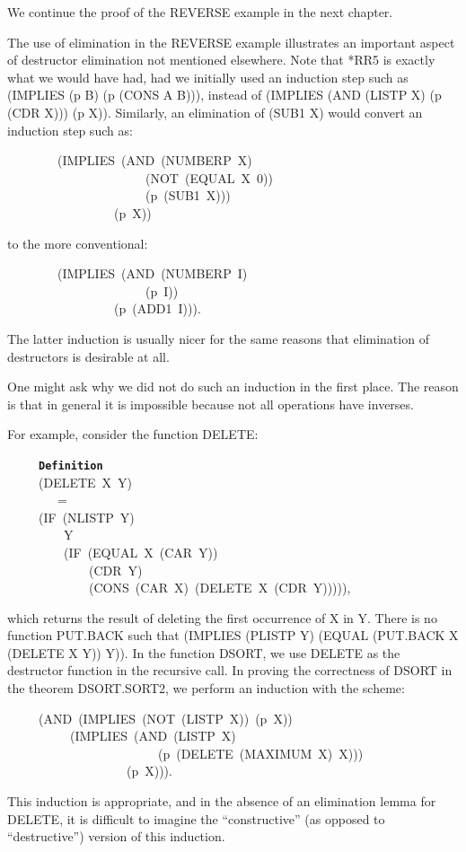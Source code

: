 \documentclass[11pt]{book}
\newenvironment{pubasis}{\begin{flushleft}\ttfamily\small}{\normalsize\rmfamily\end{flushleft}}
\newcommand{\axiomordefinition}[1]{\vspace{6pt}\texttt{\textbf{#1}}}
\begin{document}
We continue the proof of the REVERSE example in the
next chapter.

The use of elimination in the REVERSE example illustrates an important aspect of destructor elimination
not mentioned elsewhere.  Note that *RR5 is exactly what we would have
had, had we initially used an induction step such as (IMPLIES (p B) (p (CONS A B))),
instead of (IMPLIES (AND (LISTP X) (p (CDR X))) (p X)).  Similarly, an elimination
of (SUB1 X) would convert an induction step such as:
\begin{pubasis}
~~~~~~~~(IMPLIES~(AND~(NUMBERP~X)\\
~~~~~~~~~~~~~~~~~~~~~~(NOT~(EQUAL~X~0))\\
~~~~~~~~~~~~~~~~~~~~~~(p~(SUB1~X)))\\
~~~~~~~~~~~~~~~~~(p~X))\\
\end{pubasis}
to the more conventional:
\begin{pubasis}
~~~~~~~~(IMPLIES~(AND~(NUMBERP~I)\\
~~~~~~~~~~~~~~~~~~~~~~(p~I))\\
~~~~~~~~~~~~~~~~~(p~(ADD1~I))).\\
\end{pubasis}
The latter induction is usually nicer for the same reasons that
elimination of destructors is desirable at all.

One might ask why we did not do such an induction in the first place.
The reason is that in general it is impossible because not all operations
have inverses.

For example, consider the function DELETE:
\begin{pubasis}
~~~~~\axiomordefinition{Definition}\\
~~~~~(DELETE~X~Y)\\
~~~~~~~~=\\
~~~~~(IF~(NLISTP~Y)\\
~~~~~~~~~Y\\
~~~~~~~~~(IF~(EQUAL~X~(CAR~Y))\\
~~~~~~~~~~~~~(CDR~Y)\\
~~~~~~~~~~~~~(CONS~(CAR~X)~(DELETE~X~(CDR~Y))))),\\
\end{pubasis}
which returns the result of deleting the first occurrence
of X in Y.  There is no function PUT.BACK such that
(IMPLIES (PLISTP Y) (EQUAL (PUT.BACK X (DELETE X Y)) Y)).
In the function DSORT, we use DELETE as the destructor
function in the recursive call.  In proving the correctness of
DSORT in the theorem DSORT.SORT2, we perform an induction with
the scheme: 
\begin{pubasis}
~~~~~(AND~(IMPLIES~(NOT~(LISTP~X))~(p~X))\\
~~~~~~~~~~(IMPLIES~(AND~(LISTP~X)\\
~~~~~~~~~~~~~~~~~~~~~~~~(p~(DELETE~(MAXIMUM~X)~X)))\\
~~~~~~~~~~~~~~~~~~~(p~X))).\\
\end{pubasis}
This induction is appropriate, and in the
absence of an elimination lemma for DELETE, it is
difficult to imagine the ``constructive'' (as
opposed to ``destructive'') version of this induction.
\end{document}
